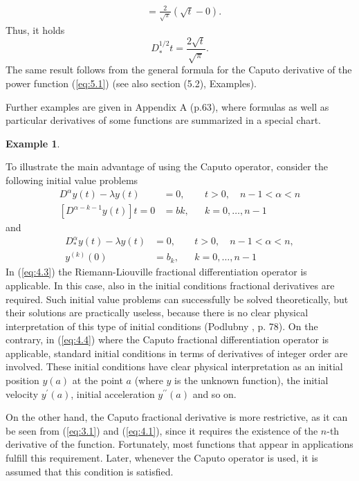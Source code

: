 \documentclass[a4paper,14pt,oneside]{book}
\theoremstyle{plain}
\theoremstyle{definition}
\newtheorem{exmp}{Example}[section]%
\theoremstyle{remark}
\begin{document}
\begin{center}
\begin{flushleft}
{$$\begin{aligned}
&=\frac{2}{\sqrt{\pi}}(\sqrt{t}-0) .
\end{aligned}
$$
Thus, it holds
\begin{equation}\label{eq:4.2}
D_{*}^{\mathrm{1} / 2} t=\frac{2 \sqrt{t}}{\sqrt{\pi}} .
\end{equation}
The same result follows from the general formula for the Caputo derivative of the power function (\ref{eq:5.1}) (see also section (5.2), Examples).
\par Further examples are given in Appendix A (p.63), where formulas as well as particular derivatives of some functions are summarized in a special chart. 
\begin{exmp}
\end{exmp}
To illustrate the main advantage of using the Caputo operator, consider the following initial value problems
\begin{equation}\label{eq:4.3}
\begin{aligned}
D^{\alpha} y(t)-\lambda y(t) &=0, & & t>0, \quad n-1<\alpha<n \\
{\left[D^{\alpha-k-1} y(t)\right]{t=0} } &=b{k}, & & k=0, \ldots, n-1
\end{aligned}
\end{equation}
and
\begin{equation}\label{eq:4.4}
\begin{aligned}
D_{*}^{\alpha} y(t)-\lambda y(t) &=0, & & t>0, \quad n-1<\alpha<n, \\
y^{(k)}(0) &=b_{k}, & & k=0, \ldots, n-1
\end{aligned}
\end{equation}
In (\ref{eq:4.3}) the Riemann-Liouville fractional differentiation operator is applicable. In this case, also in the initial conditions fractional derivatives are required. Such initial value problems can successfully be solved theoretically, but their solutions are practically useless, because there is no clear physical interpretation of this type of initial conditions (Podlubny \cite{bb22}, p. 78). On the contrary, in (\ref{eq:4.4}) where the Caputo fractional differentiation operator is applicable, standard initial conditions in terms of derivatives of integer order are involved. These initial conditions have clear physical interpretation as an initial position $y(a)$ at the point $a$ (where $y$ is the unknown function), the initial velocity $y^{\prime}(a)$, initial acceleration $y^{\prime \prime}(a)$ and so on.
\par On the other hand, the Caputo fractional derivative is more restrictive, as it can be seen from (\ref{eq:3.1}) and (\ref{eq:4.1}), since it requires the existence of the $n$-th derivative of the function. Fortunately, most functions that appear in applications fulfill this requirement. Later, whenever the Caputo operator is used, it is assumed that this condition is satisfied.
}
\end{flushleft}
\end{center}
\end{document}
